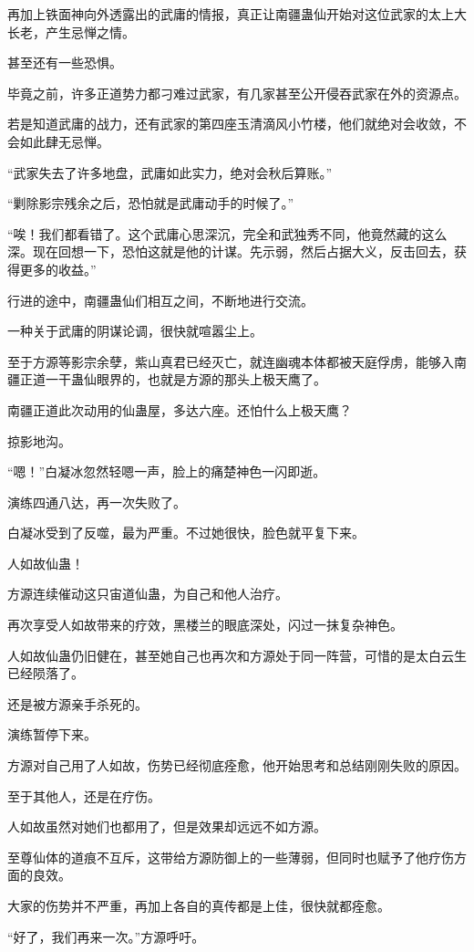\begin{this_body}
再加上铁面神向外透露出的武庸的情报，真正让南疆蛊仙开始对这位武家的太上大长老，产生忌惮之情。

甚至还有一些恐惧。

毕竟之前，许多正道势力都刁难过武家，有几家甚至公开侵吞武家在外的资源点。

若是知道武庸的战力，还有武家的第四座玉清滴风小竹楼，他们就绝对会收敛，不会如此肆无忌惮。

“武家失去了许多地盘，武庸如此实力，绝对会秋后算账。”

“剿除影宗残余之后，恐怕就是武庸动手的时候了。”

“唉！我们都看错了。这个武庸心思深沉，完全和武独秀不同，他竟然藏的这么深。现在回想一下，恐怕这就是他的计谋。先示弱，然后占据大义，反击回去，获得更多的收益。”

行进的途中，南疆蛊仙们相互之间，不断地进行交流。

一种关于武庸的阴谋论调，很快就喧嚣尘上。

至于方源等影宗余孽，紫山真君已经灭亡，就连幽魂本体都被天庭俘虏，能够入南疆正道一干蛊仙眼界的，也就是方源的那头上极天鹰了。

南疆正道此次动用的仙蛊屋，多达六座。还怕什么上极天鹰？

掠影地沟。

“嗯！”白凝冰忽然轻嗯一声，脸上的痛楚神色一闪即逝。

演练四通八达，再一次失败了。

白凝冰受到了反噬，最为严重。不过她很快，脸色就平复下来。

人如故仙蛊！

方源连续催动这只宙道仙蛊，为自己和他人治疗。

再次享受人如故带来的疗效，黑楼兰的眼底深处，闪过一抹复杂神色。

人如故仙蛊仍旧健在，甚至她自己也再次和方源处于同一阵营，可惜的是太白云生已经陨落了。

还是被方源亲手杀死的。

演练暂停下来。

方源对自己用了人如故，伤势已经彻底痊愈，他开始思考和总结刚刚失败的原因。

至于其他人，还是在疗伤。

人如故虽然对她们也都用了，但是效果却远远不如方源。

至尊仙体的道痕不互斥，这带给方源防御上的一些薄弱，但同时也赋予了他疗伤方面的良效。

大家的伤势并不严重，再加上各自的真传都是上佳，很快就都痊愈。

“好了，我们再来一次。”方源呼吁。


\end{this_body}
